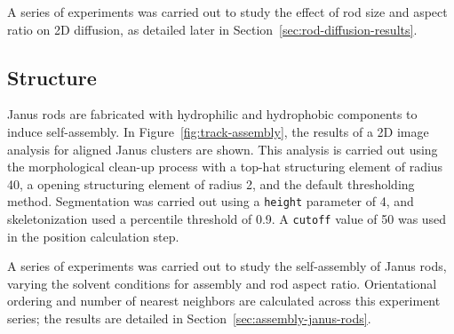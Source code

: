 A series of experiments was carried out to study the effect of rod size and aspect ratio on 2D diffusion, as 
detailed later in Section~\ref{sec:rod-diffusion-results}.

\subsection{Structure}


Janus rods are fabricated with hydrophilic and hydrophobic components to induce self-assembly.
In Figure~\ref{fig:track-assembly}, the results of a 2D image analysis for aligned Janus clusters
are shown.  This analysis is carried out using the morphological clean-up process with
a top-hat structuring element of radius 40, a opening structuring element of
radius 2, and the default thresholding method. Segmentation was carried out using a 
\texttt{height} parameter of 4, and skeletonization used a percentile threshold of 0.9.  A 
\texttt{cutoff} value of 50 was used in the position calculation step.

A series of experiments was carried out to study the self-assembly of Janus rods, varying
the solvent conditions for assembly and rod aspect ratio.  Orientational ordering and
number of nearest neighbors are calculated across this experiment series; the results are
detailed in Section~\ref{sec:assembly-janus-rods}.
